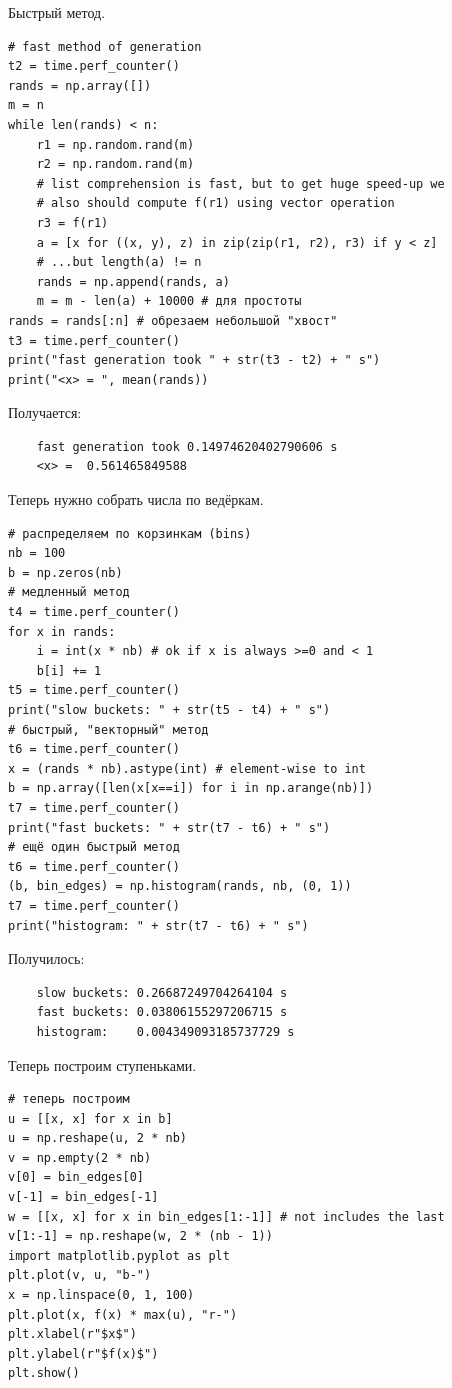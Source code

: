 \documentclass{book}
\begin{document}
Быстрый метод.
\begin{verbatim}
# fast method of generation
t2 = time.perf_counter()
rands = np.array([])
m = n
while len(rands) < n:
    r1 = np.random.rand(m)
    r2 = np.random.rand(m)
    # list comprehension is fast, but to get huge speed-up we
    # also should compute f(r1) using vector operation
    r3 = f(r1)
    a = [x for ((x, y), z) in zip(zip(r1, r2), r3) if y < z]
    # ...but length(a) != n
    rands = np.append(rands, a)
    m = m - len(a) + 10000 # для простоты
rands = rands[:n] # обрезаем небольшой "хвост"
t3 = time.perf_counter()
print("fast generation took " + str(t3 - t2) + " s")
print("<x> = ", mean(rands))
\end{verbatim}
Получается:
\begin{verbatim}
    fast generation took 0.14974620402790606 s
    <x> =  0.561465849588
\end{verbatim}
Теперь нужно собрать числа по ведёркам.
\begin{verbatim}
# распределяем по корзинкам (bins)
nb = 100
b = np.zeros(nb)
# медленный метод
t4 = time.perf_counter()
for x in rands:
    i = int(x * nb) # ok if x is always >=0 and < 1
    b[i] += 1
t5 = time.perf_counter()
print("slow buckets: " + str(t5 - t4) + " s")
# быстрый, "векторный" метод
t6 = time.perf_counter()
x = (rands * nb).astype(int) # element-wise to int
b = np.array([len(x[x==i]) for i in np.arange(nb)])
t7 = time.perf_counter()
print("fast buckets: " + str(t7 - t6) + " s")
# ещё один быстрый метод
t6 = time.perf_counter()
(b, bin_edges) = np.histogram(rands, nb, (0, 1))
t7 = time.perf_counter()
print("histogram: " + str(t7 - t6) + " s")
\end{verbatim}
Получилось:
\begin{verbatim}
    slow buckets: 0.26687249704264104 s
    fast buckets: 0.03806155297206715 s
    histogram:    0.004349093185737729 s
\end{verbatim}
Теперь построим ступеньками.
\begin{verbatim}
# теперь построим
u = [[x, x] for x in b]
u = np.reshape(u, 2 * nb)
v = np.empty(2 * nb)
v[0] = bin_edges[0]
v[-1] = bin_edges[-1]
w = [[x, x] for x in bin_edges[1:-1]] # not includes the last
v[1:-1] = np.reshape(w, 2 * (nb - 1))
import matplotlib.pyplot as plt
plt.plot(v, u, "b-")
x = np.linspace(0, 1, 100)
plt.plot(x, f(x) * max(u), "r-")
plt.xlabel(r"$x$")
plt.ylabel(r"$f(x)$")
plt.show()
\end{verbatim}

\end{document}
